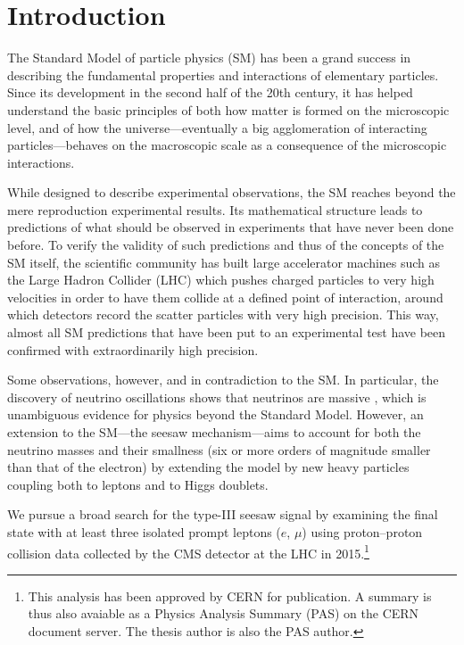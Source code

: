 \chapter{Introduction}
\label{sec:Introduction}

The Standard Model of particle physics (SM) \cite{i2003gauge,aitchison2003gauge,Peskin:257493} has been a grand success in describing the fundamental properties and interactions of elementary particles. Since its development in the second half of the 20th century, it has helped understand the basic principles of both how matter is formed on the microscopic level, and of how the universe\hairspace---\hairspace{}eventually a big agglomeration of interacting particles\hairspace---\hairspace{}behaves on the macroscopic scale as a consequence of the microscopic interactions.

While designed to describe experimental observations, the SM reaches beyond the mere reproduction experimental results. Its mathematical structure leads to predictions of what should be observed in experiments that have never been done before. To verify the validity of such predictions and thus of the concepts of the SM itself, the scientific community has built large accelerator machines such as the Large Hadron Collider (LHC) \cite{Evans:2008zzb} which pushes charged particles to very high velocities in order to have them collide at a defined point of interaction, around which detectors record the scatter particles with very high precision. This way, almost all SM predictions that have been put to an experimental test have been confirmed with extraordinarily high precision.

Some observations, however, and in contradiction to the SM. In particular, the discovery of neutrino oscillations shows that neutrinos are massive \cite{Nustatus}, which is unambiguous evidence for physics beyond the Standard Model. However, an extension to the SM\hairspace---\hairspace{}the seesaw mechanism\hairspace---\hairspace{}aims to account for both the neutrino masses and their smallness (six or more orders of magnitude smaller than that of the electron) by extending the model by new heavy particles coupling both to leptons and to Higgs doublets.

We pursue a broad search for the type-III seesaw signal \cite{SeesawIII:a} by examining the final state with at least three isolated prompt leptons ($e$, $\mu$) using proton--proton collision data collected by the CMS detector \cite{Chatrchyan:2008zzk} at the LHC in 2015.\footnote{This analysis has been approved by CERN for publication. A summary is thus also avaiable as a Physics Analysis Summary (PAS) \cite{CMS-PAS-EXO-16-002} on the CERN document server. The thesis author is also the PAS author.}


